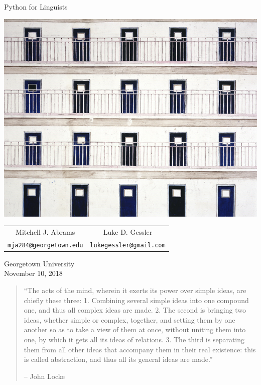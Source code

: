 \documentclass{article}
\begin{document}

\begin{center}
    
    
    {\huge Python for Linguists}
    
    \vspace{1.5in}
    
    \includegraphics[scale=3.2]{doors.jpg}
    
    \vfill
    
    \large 
    \begin{tabular}{cc}
        Mitchell J. Abrams & Luke D. Gessler \\
        {\tt\normalsize mja284@georgetown.edu} & {\tt\normalsize lukegessler@gmail.com} \\
    \end{tabular}
    
    
    \vspace{0.3in}
    
    {\normalsize Georgetown University\\November 10, 2018}
    
\end{center}

\null\clearpage
{}

\begin{quote}
    ``The acts of the mind, wherein it exerts its power over simple ideas, are chiefly these three: 1. Combining several simple ideas into one compound one, and thus all complex ideas are made. 2. The second is bringing two ideas, whether simple or complex, together, and setting them by one another so as to take a view of them at once, without uniting them into one, by which it gets all its ideas of relations. 3. The third is separating them from all other ideas that accompany them in their real existence: this is called abstraction, and thus all its general ideas are made.''
    
    -- John Locke
\end{quote}
\end{document}
